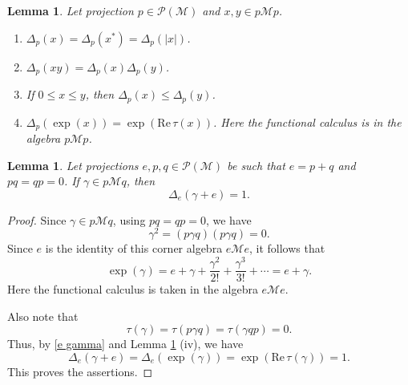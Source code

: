 \documentclass[11]{amsart}
\numberwithin{equation}{section}
\newtheorem{lemma}[theorem]{Lemma}
\begin{document}
\begin{lemma}\label{thm FK}
	Let projection $p\in \mathcal{P}(\mathcal{M})$ and $x,y\in p\mathcal{M}p$. 
	\begin{enumerate}[{\rm (i)}]
		\item $\Delta_p(x)=\Delta_p(x^*)=\Delta_p(|x|)$.
		\item $\Delta_p(xy)=\Delta_p(x)\Delta_p(y)$.
		\item If $0\leq x\leq y$, then $\Delta_p(x)\leq \Delta_p(y)$.
		\item $\Delta_p(\exp(x))=\exp(\mathrm{Re}\,\tau(x))$. Here the functional calculus is in the algebra $p\mathcal{M}p$.
	\end{enumerate}
\end{lemma}


\begin{lemma}\label{lem Fk 0}
	Let projections $e,p,q\in\mathcal{P}(\mathcal{M})$ be such that $e=p+q$ and $pq=qp=0$. If $\gamma\in p\mathcal{M}q$, then 
	\[\Delta_e(\gamma+e)=1.\]
\end{lemma}



\begin{proof}
	Since $\gamma\in p\mathcal{M}q$,  using $pq=qp=0$, we have
	\[
	\gamma^2=(p\gamma q)(p\gamma q)=0.
	\]
Since  $e$ is the identity of this corner algebra $e\mathcal{M}e$, it follows that 
	\begin{equation}\label{e gamma}
\exp(\gamma)
=e+\gamma+\frac{\gamma^2}{2!}+\frac{\gamma^3}{3!}+\cdots
=e+\gamma.
	\end{equation}
	Here the functional calculus is taken in the algebra $e\mathcal{M}e$.
	
	Also note that 
	\[\tau (\gamma)=\tau(p\gamma q)=\tau (\gamma q p)=0.\]
	Thus, by  \eqref{e gamma} and Lemma \ref{thm FK} (iv), we have
	\[\Delta_e(\gamma+e)=\Delta_e(\exp(\gamma))=\exp(\mathrm{Re}\,\tau(\gamma))=1.\]
	This proves the assertions.
\end{proof}
\end{document}
